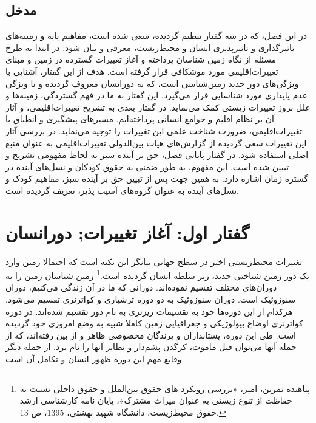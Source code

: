 
\subsection*{مدخل}
در این فصل، که در سه گفتار تنظیم گردیده، سعی شده است، مفاهیم پایه و زمینه‌های تاثیر‌گذاری و تاثیر‌پذیری انسان و  محیط‌زیست، معرفی و بیان شود. 
در ابتدا به طرح مسئله از نگاه زمین شناسان پرداخته و آغاز تغییرات گسترده در زمین و مبنای تغییرات‌اقلیمی مورد موشکافی قرار گرفته است. هدف از این گفتار، آشنایی با ویژگی‌های دور جدید زمین‌شناسی است، که به دورانسان
 معروف گردیده و با ویژگی عدم پایداری مورد شناسایی قرار می‌گیرد. این گفتار به ما در فهم گستردگی، زمینه‌ها و علل بروز تغییرات زیستی کمک می‌نماید. 
در گفتار بعدی به تشریح تغییرات‌اقلیمی، و آثار آن بر نظام اقلیم و جوامع انسانی پرداخته‌ایم. مسیرهای پیشگیری و انطباق با تغییرات‌اقلیمی، ضرورت شناخت علمی این تغییرات را توجیه می‌نماید. در بررسی آثار این تغییرات سعی گردیده از گزارش‌های هیات بین‌الدولی تغییرات‌اقلیمی به عنوان منبع اصلی استفاده شود. 
در گفتار پایانی فصل، حق بر آینده سبز به لحاظ مفهومی تشریح و تبیین شده است. این مفهوم، به طور ضمنی به حقوق کودکان و نسل‌های آینده در گستره زمان اشاره دارد. به همین جهت پس از تبیین حق بر آینده سبز، مفاهیم کودک و نسل‌های آینده به عنوان گروه‌های آسیب پذیر، تعریف گردیده است.



\section*{گفتار اول:  آغاز تغییرات; دورانسان }


تغییرات محیط‌زیستی اخیر در سطح جهانی بیانگر این نکته است که احتمالا زمین وارد یک دور زمین شناختی جدید، زیر سلطه انسان گردیده است.\footnote{پناهنده ثمرین، امیر، «بررسی رویکرد های حقوق بین‌الملل و حقوق داخلی نسبت به حفاظت از تنوع زیستی به عنوان میراث مشترک»، پایان نامه کارشناسی ارشد حقوق  محیط‌زیست، دانشگاه شهید بهشتی، 1395، ص 13.}
 زمین شناسان زمین را به دوران‌های مختلف تقسیم نموده‌اند. دورانی که ما در آن زندگی می‌کنیم، دوران سنوزوئیک 
  است. دوران سنوزوئیک به دو دوره ترشیاری  و کواترنری  تقسیم می‌شود. هرکدام از این دوره‌ها خود به تقسیمات ریزتری به نام دور تقسیم شده‌اند. در دوره کواترنری اوضاع بیولوژیکی و جغرافیایی زمین کاملا شبیه به وضع امروزی خود گردیده است. طی این دوره، پستانداران و پرندگان مخصوصی ظاهر و از بین رفته‌اند، که از جمله آنها می‌توان فیل ماموت، کرگدن پشم‌دار و نظایر آنها را نام برد. از جمله دیگر وقایع مهم این دوره ظهور انسان و تکامل آن است.
  
